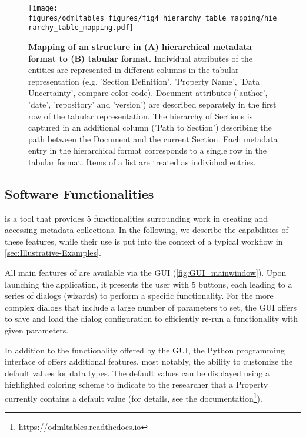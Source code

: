 \begin{figure}[!ht]
\begin{center}
\texttt{[image: figures/odmltables\_figures/fig4\_hierarchy\_table\_mapping/hierarchy\_table\_mapping.pdf]}
\caption[Mapping between hierarchical and tabular metadata format]{{\label{fig:tree_and_table}
\textbf{Mapping of an  structure in (A) hierarchical metadata format to (B) tabular format.} Individual attributes of the  entities are represented in different columns in the tabular representation (e.g. 'Section Definition', 'Property Name', 'Data Uncertainty', compare color code). Document attributes ('author', 'date', 'repository' and 'version') are described separately in the first row of the tabular representation. The hierarchy of Sections is captured in an additional column ('Path to Section') describing the path between the  Document and the current Section. Each metadata entry in the hierarchical format corresponds to a single row in the tabular format. Items of a list are treated as individual entries.
}}
\end{center}
\end{figure}

\subsection{Software Functionalities}
\label{sec:software_functionalities} 

 is a tool that provides 5 functionalities surrounding work in creating and accessing metadata collections. In the following, we describe the capabilities of these features, while their use is put into the context of a typical workflow in \cref{sec:Illustrative-Examples}.

All main features of  are available via the  GUI (\cref{fig:GUI_mainwindow}). Upon launching the application, it presents the user with 5 buttons, each leading to a series of dialogs (wizards) to perform a specific  functionality. For the more complex dialogs that include a large number of parameters to set, the GUI offers to save and load the dialog configuration to efficiently re-run a functionality with given parameters. 

In addition to the functionality offered by the GUI, the Python programming interface of  offers additional features, most notably, the ability to customize the default values for  data types. The default values can be displayed using a highlighted coloring scheme to indicate to the researcher that a Property currently contains a default value (for details, see the  documentation\footnote{\url{https://odmltables.readthedocs.io}}).

